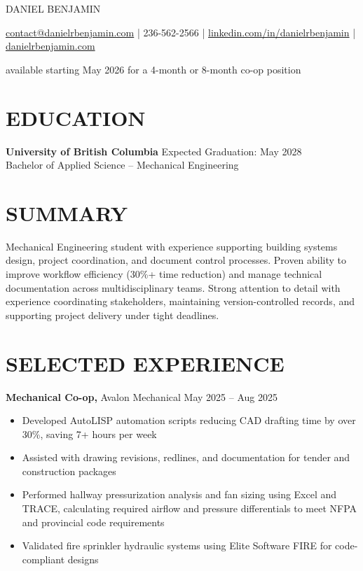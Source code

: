 \documentclass[11pt]{article}       %
\begin{document}
\centerline{\Huge \color{accentColour} DANIEL BENJAMIN}

\vspace{5pt}

\centerline{\href{mailto:contact@danielrbenjamin.com}{contact@danielrbenjamin.com} | 236-562-2566 | \href{https://www.linkedin.com/in/danielrbenjamin}{linkedin.com/in/danielrbenjamin} | \href{https://www.danielrbenjamin.com/}{danielrbenjamin.com}}

\centerline{available starting May 2026 for a 4-month or 8-month co-op position}

\vspace{-6.5pt}

\section*{EDUCATION}
\textbf{University of British Columbia} \hfill Expected Graduation: May 2028
\\Bachelor of Applied Science – Mechanical Engineering

\vspace{-6.5pt}

\section*{SUMMARY}
Mechanical Engineering student with experience supporting building systems design, project coordination, and document control processes. Proven ability to improve workflow efficiency (30\%+ time reduction) and manage technical documentation across multidisciplinary teams. Strong attention to detail with experience coordinating stakeholders, maintaining version-controlled records, and supporting project delivery under tight deadlines.
\vspace{-3pt}

\section*{SELECTED EXPERIENCE}

\textbf{Mechanical Co-op,} {Avalon Mechanical} \hfill May 2025 -- Aug 2025 \\
\vspace{-8.5pt}
\begin{itemize}
   \item Developed AutoLISP automation scripts reducing CAD drafting time by over 30\%, saving 7+ hours per week
  \item Assisted with drawing revisions, redlines, and documentation for tender and construction packages
  \item Performed hallway pressurization analysis and fan sizing using Excel and TRACE, calculating required airflow and pressure differentials to meet NFPA and provincial code requirements
  \item Validated fire sprinkler hydraulic systems using Elite Software FIRE for code-compliant designs
\end{itemize}
\end{document}
